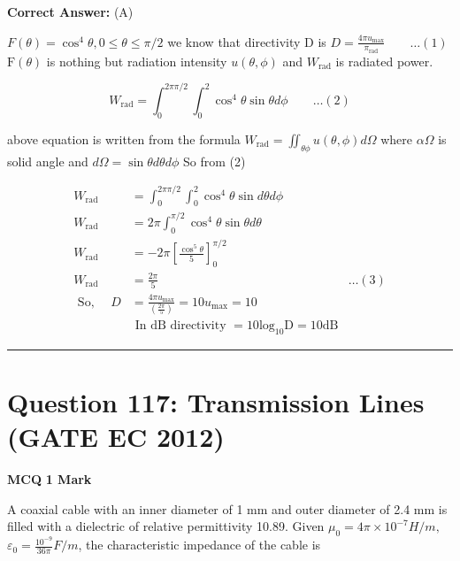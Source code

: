 \documentclass[11pt,a4paper]{article}
\begin{document}
\noindent \textbf{Correct Answer:} (A)

\begin{tcolorbox}[solbox, title=Detailed Solution -- Question 116]
$F(\theta)=\cos ^{4} \theta, 0 \leq \theta \leq \pi / 2$
 we know that directivity D is
$D=\frac{4 \pi u_{\max }}{\pi_{\mathrm{rad}}} \qquad\ldots(1)$
$\mathrm{F}(\theta)$ is nothing but radiation intensity $u(\theta, \phi)$ and
$W_{\mathrm{rad}}$ is radiated power.

\[
W_{\mathrm{rad}}=\int_{0}^{2 \pi \pi / 2} \int_{0}^{2} \cos ^{4} \theta \sin \theta d \phi\qquad\ldots(2)
\]

 above equation is written from the formula
$W_{\mathrm{rad}}=\iint_{\theta \phi} u(\theta, \phi) d \Omega$
 where $\alpha \Omega$ is solid angle and $d \Omega=\sin \theta d \theta d \phi$
 So from (2)

\[
\begin{aligned} W_{\mathrm{rad}} &=\int_{0}^{2 \pi \pi / 2} \int_{0}^{2} \cos ^{4} \theta \sin d \theta d \phi \\ W_{\mathrm{rad}} &=2 \pi \int_{0}^{\pi / 2} \cos ^{4} \theta \sin \theta d \theta \\W_{\mathrm{rad}}&=-2 \pi\left[\frac{\cos ^{5} \theta}{5}\right]_{0}^{\pi / 2}\\
W_{\mathrm{rad}}&=\frac{2 \pi}{5}&\ldots(3)\\
\text { So, } \quad D&=\frac{4 \pi u_{\max }}{\left(\frac{2 \pi}{5}\right)}=10 u_{\max }=10\\
&\text { In } \mathrm{dB} \text { directivity }=10 \mathrm{log}_{10} \mathrm{D}=10 \mathrm{dB}\end{aligned}
\]
\end{tcolorbox}

\vspace{1.5em}
\hrule
\vspace{1.5em}

\section*{Question 117: Transmission Lines (GATE EC 2012)}
\noindent \textbf{\color{primary}MCQ} \hfill \textbf{\color{secondary}1 Mark}


\noindent A coaxial cable with an inner diameter of 1 mm and outer diameter of 2.4 mm is filled with a
dielectric of relative permittivity 10.89. Given $\mu _{0}=4 \pi \times 10^{-7} H/m,$ $\varepsilon _{0}=\frac{10^{-9}}{36 \pi} F/m$, the characteristic impedance of the cable is
\end{document}
